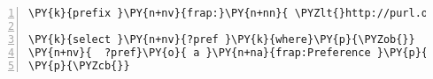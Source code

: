 \expandafter\def\csname PY@tok@err\endcsname{}
\begin{Verbatim}[commandchars=\\\{\},numbers=left,firstnumber=1,stepnumber=1]
\PY{k}{prefix }\PY{n+nv}{frap:}\PY{n+nn}{ \PYZlt{}http://purl.org/frap/\PYZgt{}}

\PY{k}{select }\PY{n+nv}{?pref }\PY{k}{where}\PY{p}{\PYZob{}}
\PY{n+nv}{	?pref}\PY{o}{ a }\PY{n+na}{frap:Preference }\PY{p}{.}
\PY{p}{\PYZcb{}}
\end{Verbatim}
